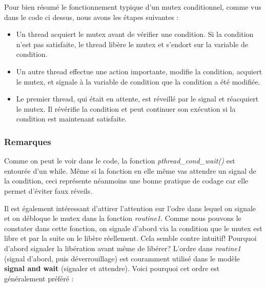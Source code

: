 Pour bien résumé le fonctionnement typique d'un mutex conditionnel, comme vus dans le code ci dessus, nous avons les étapes suivantes :
\vspace{\baselineskip}
\begin{itemize}
    \item Un thread acquiert le mutex avant de vérifier une condition. Si la condition n'est pas satisfaite, le thread libère le mutex et s'endort sur la variable de condition.
    \\
    \item Un autre thread effectue une action importante, modifie la condition, acquiert le mutex, et signale à la variable de condition que la condition a été modifiée.
    \\
    \item Le premier thread, qui était en attente, est réveillé par le signal et réacquiert le mutex. Il révérifie la condition et peut continuer son exécution si la condition est maintenant satisfaite.
\end{itemize}
\vspace{\baselineskip}

\subsubsection{Remarques}

Comme on peut le voir dans le code, la fonction \textit{pthread\_cond\_wait()} est entourée d'un while. Même si la fonction en elle même vas attendre un signal de la condition, ceci représente néanmoins une bonne pratique de codage car elle permet d'éviter faux réveils.
\vspace{\baselineskip}

Il est également intéressant d'attirer l'attention sur l'odre dans lequel on signale et on débloque le mutex dans la fonction \textit{routine1}. Comme nous pouvons le constater dans cette fonction, on signale d'abord via la condition que le mutex est libre et par la suite on le libère réellement. Cela semble contre intuitif! Pourquoi d'abord signaler la libération avant même de libérer? L'ordre dans \textit{routine1} (signal d'abord, puis déverrouillage) est couramment utilisé dans le modèle \textbf{signal and wait} (signaler et attendre). Voici pourquoi cet ordre est généralement préféré : 

